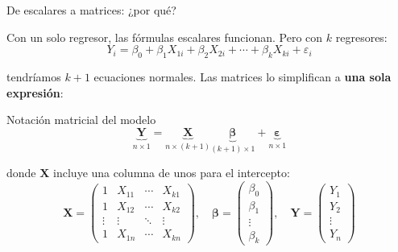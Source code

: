 \documentclass[aspectratio=169, 11pt]{beamer}
\begin{document}

\begin{frame}{De escalares a matrices: ¿por qué?}
\small

Con un solo regresor, las fórmulas escalares funcionan. Pero con $k$ regresores:
\[
Y_i = \beta_0 + \beta_1 X_{1i} + \beta_2 X_{2i} + \cdots + \beta_k X_{ki} + \varepsilon_i
\]

tendríamos $k+1$ ecuaciones normales. Las matrices lo simplifican a \textbf{una sola expresión}:

\vspace{0.2cm}
\begin{block}{Notación matricial del modelo}
\[
\underbrace{\mathbf{Y}}_{n \times 1} = \underbrace{\mathbf{X}}_{n \times (k+1)} \underbrace{\boldsymbol{\beta}}_{(k+1) \times 1} + \underbrace{\boldsymbol{\varepsilon}}_{n \times 1}
\]
\end{block}

donde $\mathbf{X}$ incluye una columna de unos para el intercepto:
\[
\mathbf{X} = \begin{pmatrix} 1 & X_{11} & \cdots & X_{k1} \\ 1 & X_{12} & \cdots & X_{k2} \\ \vdots & \vdots & \ddots & \vdots \\ 1 & X_{1n} & \cdots & X_{kn} \end{pmatrix}, \quad
\boldsymbol{\beta} = \begin{pmatrix} \beta_0 \\ \beta_1 \\ \vdots \\ \beta_k \end{pmatrix}, \quad
\mathbf{Y} = \begin{pmatrix} Y_1 \\ Y_2 \\ \vdots \\ Y_n \end{pmatrix}
\]
\end{frame}

\end{document}
